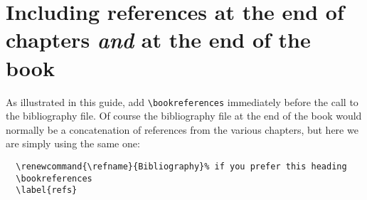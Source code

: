 \section[Including references at the end of chapters \textit{and} at the end of the book]%
  {Including references at the end of chapters \textit{and} at the end of the book
  }

As illustrated in this guide, add \verb"\bookreferences" immediately before the call 
to the bibliography file. Of course the bibliography file at the end of the book would 
normally be a concatenation of references from the various chapters, but here we are simply using the same one:
\begin{verbatim}
  \renewcommand{\refname}{Bibliography}% if you prefer this heading
  \bookreferences
  \label{refs}
  
\end{verbatim}
\endinput